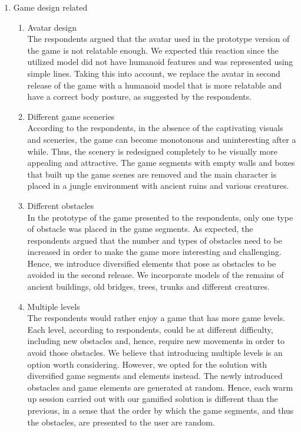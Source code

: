 \begin{enumerate}
\item Game design related
	\begin{enumerate}
		\item Avatar design\\
The respondents argued that the avatar used in the prototype version of the game is not relatable enough. We expected this reaction since the utilized model did not have humanoid features and was represented using simple lines. Taking this into account, we replace the avatar in second release of the game with a humanoid model that is more relatable and have a correct body posture, as suggested by the respondents.
\item Different game sceneries\\ 
According to the respondents, in the absence of the captivating visuals and sceneries, the game can become monotonous and uninteresting after a while. Thus, the scenery is redesigned completely to be visually more appealing and attractive. The game segments with empty walls and boxes that built up the game scenes are removed and the main character is placed in a jungle environment with ancient ruins and various creatures. 
\item Different obstacles\\
In the prototype of the game presented to the respondents, only one type of obstacle was placed in the game segments.  As expected, the respondents argued that the number and types of obstacles need to be increased in order to make the game more interesting and challenging. Hence, we introduce diversified elements that pose as obstacles to be avoided in the second release. We incorporate models of the remains of ancient buildings, old bridges, trees, trunks and different creatures.  
\item Multiple levels\\
The respondents would rather enjoy a game that has more game levels. Each level, according to respondents, could be at different difficulty, including new obstacles and, hence, require new movements in order to avoid those obstacles. We believe that introducing multiple levels is an option worth considering. However, we opted for the solution with diversified game segments and elements instead. The newly introduced obstacles and game elements are generated at random. Hence, each warm up session carried out with our gamified solution is different than the previous, in a sense that the order by which the game segments, and thus the obstacles, are presented to the user are random.  

\end{enumerate}
\end{enumerate}
